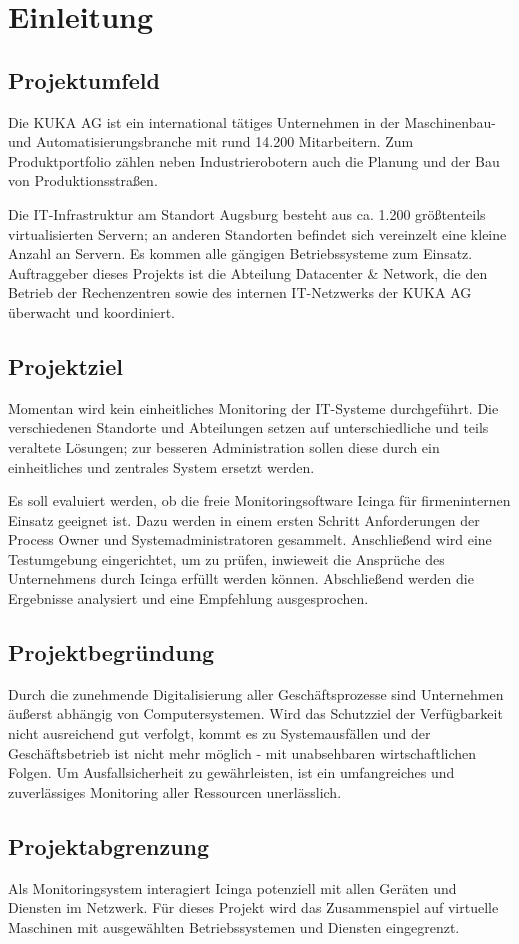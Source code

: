 \section{Einleitung}
\label{sec:Einleitung}

\subsection{Projektumfeld} 
\label{sec:Projektumfeld}
Die KUKA AG ist ein international tätiges Unternehmen in der Maschinenbau- und Automatisierungsbranche mit rund 14.200 Mitarbeitern. Zum Produktportfolio zählen neben Industrierobotern auch die Planung und der Bau von Produktionsstraßen.

Die IT-Infrastruktur am Standort Augsburg besteht aus ca. 1.200 größtenteils virtualisierten Servern; an anderen Standorten befindet sich vereinzelt eine kleine Anzahl an Servern. Es kommen alle gängigen Betriebssysteme zum Einsatz. Auftraggeber dieses Projekts ist die Abteilung \glqq Datacenter \& Network\grqq{}, die den Betrieb der Rechenzentren sowie des internen IT-Netzwerks der KUKA AG überwacht und koordiniert.

\subsection{Projektziel} 
\label{sec:Projektziel}
Momentan wird kein einheitliches Monitoring der IT-Systeme durchgeführt. Die verschiedenen Standorte und Abteilungen setzen auf unterschiedliche und teils veraltete Lösungen; zur besseren Administration sollen diese durch ein einheitliches und zentrales System ersetzt werden.

Es soll evaluiert werden, ob die freie Monitoringsoftware \glqq Icinga\grqq{} für firmeninternen Einsatz geeignet ist. Dazu werden in einem ersten Schritt Anforderungen der Process Owner und Systemadministratoren gesammelt. Anschließend wird eine Testumgebung eingerichtet, um zu prüfen, inwieweit die Ansprüche des Unternehmens durch \glqq Icinga\grqq{} erfüllt werden können. Abschließend werden die Ergebnisse analysiert und eine Empfehlung ausgesprochen.

\subsection{Projektbegründung} 
\label{sec:Projektbegruendung}
Durch die zunehmende Digitalisierung aller Geschäftsprozesse sind Unternehmen äußerst abhängig von Computersystemen. Wird das Schutzziel der Verfügbarkeit nicht ausreichend gut verfolgt, kommt es zu Systemausfällen und der Geschäftsbetrieb ist nicht mehr möglich - mit unabsehbaren wirtschaftlichen Folgen. Um Ausfallsicherheit zu gewährleisten, ist ein umfangreiches und zuverlässiges Monitoring aller Ressourcen unerlässlich.

\subsection{Projektabgrenzung} 
\label{sec:Projektabgrenzung}
Als Monitoringsystem interagiert \glqq Icinga\grqq{} potenziell mit allen Geräten und Diensten im Netzwerk. Für dieses Projekt wird das Zusammenspiel auf virtuelle Maschinen mit ausgewählten Betriebssystemen und Diensten eingegrenzt.